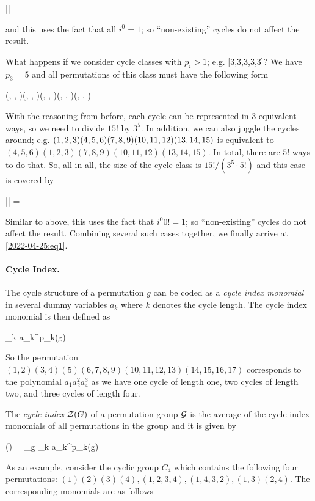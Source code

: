 \bee
|\Cc| = 
\eee

and this uses the fact that all $i^0 = 1$; so ``non-existing'' cycles do not affect the result.

What happens if we consider cycle classes with $p_i > 1$; e.g. [3,3,3,3,3]? We have $p_3=5$ and all permutations of this class must have the following form

\bee
(\cdot, \cdot, \cdot)(\cdot, \cdot, \cdot)(\cdot, \cdot, \cdot)(\cdot, \cdot, \cdot)(\cdot, \cdot, \cdot)
\eee

With the reasoning from before, each cycle can be represented in $3$ equivalent ways, so we need to divide $15!$ by $3^5$. In addition, we can also juggle the cycles around; e.g. $(1,2,3)(4,5,6)(7,8,9)\\(10,11,12)(13,14,15)$ is equivalent to $(4,5,6)(1,2,3)(7,8,9)(10,11,12)(13,14,15)$. In total, there are $5!$ ways to do that. So, all in all, the size of the cycle class is $15!/(3^5 \cdot 5!)$ and this case is covered by

\bee
|\Cc| = 
\eee

Similar to above, this uses the fact that $i^0 0! = 1$; so ``non-existing'' cycles do not affect the result. Combining several such cases together, we finally arrive at \eqref{2022-04-25:eq1}.


\paragraph{Cycle Index.} The cycle structure of a permutation $g$ can be coded as a \emph{cycle index monomial} in several dummy variables $a_k$ where $k$ denotes the cycle length. The cycle index monomial is then defined as

\bee
\prod_k a_k^{p_k(g)}
\eee

So the permutation $(1,2)(3,4)(5)(6,7,8,9)(10,11,12,13)(14,15,16,17)$ corresponds to the polynomial $a_1 a_2^2 a_4^3$ as we have one cycle of length one, two cycles of length two, and three cycles of length four.

The \emph{cycle index} $\mathcal{Z}(G)$ of a permutation group $\mathcal{G}$ is the average of the cycle index monomials of all permutations in the group and it is given by

\bee
\Zc(\Gc) =  \sum_{g \in \Gc} \prod_k a_k^{p_k(g)}
\eee

As an example, consider the cyclic group $C_4$ which contains the following four permutations: $(1)(2)(3)(4), (1,2,3,4), (1,4,3,2),(1,3)(2,4)$. The corresponding monomials are as follows

